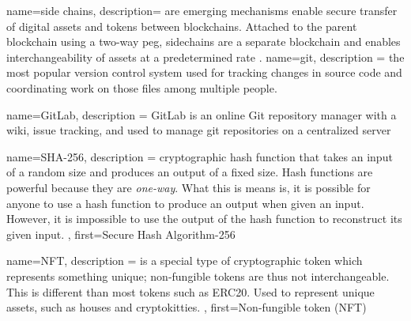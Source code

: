 {
	name={side chains},
	description= {
	are emerging mechanisms enable secure transfer of digital assets and tokens between blockchains. Attached to the parent blockchain using a two-way peg, sidechains are a separate blockchain and enables interchangeability of assets at a predetermined rate \cite{sideChains:Online}. 
	}
}
{
	name={git},
	description ={
			the most popular version control system used for tracking changes in source code and coordinating work on those files among multiple people.
	}
}


{
	name={GitLab},
	description ={
		GitLab is an online Git repository manager with a wiki, issue tracking, and used to manage \gls{git} repositories on a centralized server
	}
}

{
	name={SHA-256},
	description ={
		cryptographic hash function that takes an input of a random size and produces an output of a fixed size. Hash functions are powerful because they are \textit{one-way}. What this is means is, it is possible for anyone to use a hash function to produce an output when given an input. However, it is impossible to use the output of the hash function to reconstruct its given input.
	},
	first={Secure Hash Algorithm-256}
}


{
	name={NFT},
	description ={
		is a special type of cryptographic token which represents something unique; non-fungible tokens are thus not interchangeable. This is different than most tokens such as ERC20. Used to represent unique assets, such as houses and cryptokitties.
	},
	first={Non-fungible token (NFT)}
}
\makeglossaries
